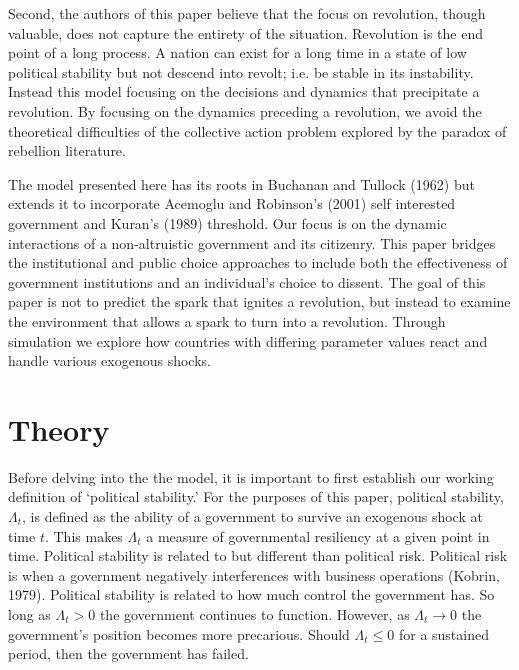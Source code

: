 \documentclass[12pt]{article}
\begin{document}
\begin{spacing}{1.5}
Second, the authors of this paper believe that the focus on revolution, though valuable, does not capture the entirety of the situation. Revolution is the end point of a long process. A nation can exist for a long time in a state of low political stability but not descend into revolt; i.e. be stable in its instability. Instead this model focusing on the decisions and dynamics that precipitate a revolution. By focusing on the dynamics preceding a revolution, we avoid the theoretical difficulties of the collective action problem explored by the paradox of rebellion literature.  

The model presented here has its roots in Buchanan and Tullock (1962) but extends it to incorporate Acemoglu and Robinson's (2001) self interested government and Kuran's (1989) threshold. Our focus is on the dynamic interactions of a non-altruistic government and its citizenry. This paper bridges the institutional and public choice approaches to include both the effectiveness of government institutions and an individual's choice to dissent. The goal of this paper is not to predict the spark that ignites a revolution, but instead to examine the environment that allows a spark to turn into a revolution. Through simulation we explore how countries with differing parameter values react and handle various exogenous shocks. 


\section{Theory}

Before delving into the the model, it is important to first establish our working definition of `political stability.' For the purposes of this paper, political stability, $\Lambda_t$, is defined as the ability of a government to survive an exogenous shock at time $t$. This makes $\Lambda_t$ a measure of governmental resiliency at a given point in time. Political stability is related to but different than political risk. Political risk is when a government negatively interferences with business operations (Kobrin, 1979). Political stability is related to how much control the government has. So long as $\Lambda_t>0$ the government continues to function. However, as $\Lambda_t\rightarrow 0$ the government's position becomes more precarious. Should $\Lambda_t \leq 0$ for a sustained period, then the government has failed.  


\end{spacing}
\end{document}
